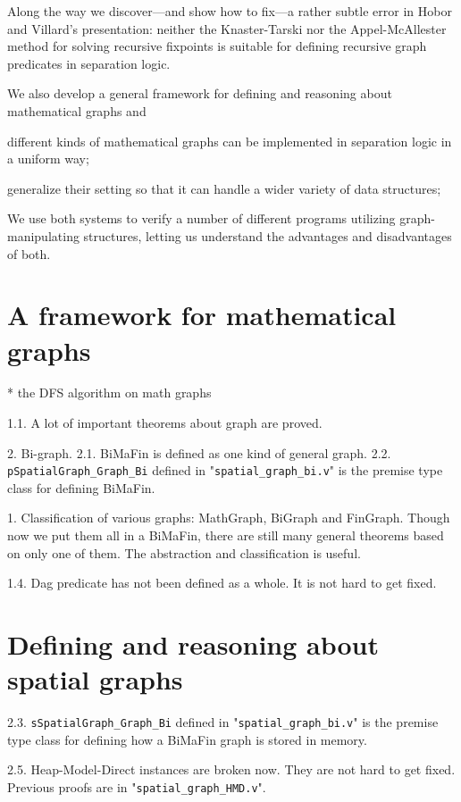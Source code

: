 \documentclass[pldi]{sigplanconf-pldi15}
\begin{document}
Along the way we discover---and show how to fix---a rather subtle error in Hobor and Villard's presentation: neither the 
Knaster-Tarski \cite{tarski:fixpoint} nor the Appel-McAllester \cite{appel:fixpoint} method for solving recursive fixpoints is suitable for defining
recursive graph predicates in separation logic.

  We also develop a general framework for defining and reasoning about mathematical 
graphs and 

different kinds of mathematical
graphs can be implemented in separation logic in a uniform way; 

generalize their setting
so that it can handle a wider variety of data structures; 

We use both systems to verify a number of different programs utilizing graph-manipulating structures,
letting us understand the advantages and disadvantages of both.

\section{A framework for mathematical graphs}

* the DFS algorithm on math graphs

1.1. A lot of important theorems about graph are proved.

2. Bi-graph.
2.1. BiMaFin is defined as one kind of general graph.
2.2. \texttt{pSpatialGraph\_Graph\_Bi} defined in "\texttt{spatial\_graph\_bi.v}" is the premise type class for defining BiMaFin.

1. Classification of various graphs: MathGraph, BiGraph and FinGraph. Though now we put them all in a BiMaFin, there are still many general theorems based on only one of them. The abstraction and classification is useful.

1.4. Dag predicate has not been defined as a whole. It is not hard to get fixed.

\section{Defining and reasoning about spatial graphs}

2.3. \texttt{sSpatialGraph\_Graph\_Bi} defined in "\texttt{spatial\_graph\_bi.v}" is the premise type class for defining how a BiMaFin graph is stored in memory.

2.5. Heap-Model-Direct instances are broken now. They are not hard to get fixed. Previous proofs are in "\texttt{spatial\_graph\_HMD.v}".
\end{document}
